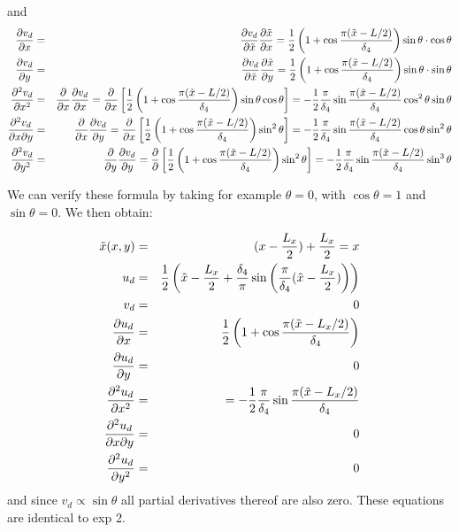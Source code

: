 and
\begin{eqnarray}
\frac{\partial v_d}{\partial x} 
&=& \frac{\partial v_d}{\partial \tilde{x}}  \frac{\partial \tilde{x}}{\partial x} 
= \frac12 \left(1+\cos\frac{ \pi ( \tilde{x}-L/2)}{\delta_4} \right) \sin\theta \cdot \cos\theta
\nonumber\\ 
\frac{\partial v_d}{\partial y} 
&=& \frac{\partial v_d}{\partial \tilde{x}}  \frac{\partial \tilde{x}}{\partial y} 
= \frac12 \left(1+\cos\frac{ \pi ( \tilde{x}-L/2)}{\delta_4} \right) \sin\theta \cdot \sin \theta
\nonumber\\
\frac{\partial^2 v_d}{\partial x^2}          
&=& \frac{\partial }{\partial x} \frac{\partial v_d}{\partial x}   
= \frac{\partial }{\partial x} \left[  \frac12 \left(1+\cos\frac{ \pi ( \tilde{x}-L/2)}{\delta_4} \right) \sin\theta \cos\theta     \right]  
= -  \frac12 \frac{\pi}{\delta_4}    \sin\frac{ \pi ( \tilde{x}-L/2)}{\delta_4}   \cos^2\theta \sin\theta
\nonumber \\
\frac{\partial^2 v_d}{\partial x \partial y} 
&=& \frac{\partial }{\partial x} \frac{\partial v_d}{\partial y}   
= \frac{\partial }{\partial x} \left[ \frac12 \left(1+\cos\frac{ \pi ( \tilde{x}-L/2)}{\delta_4} \right) \sin^2\theta    \right] 
= -\frac12 \frac{\pi}{\delta_4}   \sin\frac{ \pi ( \tilde{x}-L/2)}{\delta_4}  \cos\theta  \sin^2\theta  
\nonumber\\
\frac{\partial^2 v_d}{\partial y^2}          
&=& \frac{\partial }{\partial y} \frac{\partial v_d}{\partial y}   
= \frac{\partial }{\partial } \left[ \frac12 \left(1+\cos\frac{ \pi ( \tilde{x}-L/2)}{\delta_4} \right) \sin^2\theta      \right] 
= - \frac12 \frac{\pi}{\delta_4}  \sin\frac{ \pi ( \tilde{x}-L/2)}{\delta_4} \sin^3\theta \nonumber
\end{eqnarray}

We can verify these formula by taking for example $\theta=0$, with $\cos \theta=1$ and $\sin\theta=0$. We then obtain:

\begin{eqnarray}
\tilde{x}(x,y) &=& (x-\frac{L_x}{2}) +  \frac{L_x}{2} =x \nonumber\\
u_d &=&  \frac12 \left(\tilde{x}-\frac{L_x}{2} +\frac{\delta_4}{\pi} \sin\left(\frac{\pi}{\delta_4}(\tilde{x}-\frac{L_x}{2}) \right) \right) \nonumber\\
v_d &=&  0 
\nonumber\\
\frac{\partial u_d}{\partial x} &=& \frac12 \left(1+\cos\frac{ \pi ( \tilde{x}-L_x/2)}{\delta_4} \right) \nonumber\\
\frac{\partial u_d}{\partial y} &=& 0 \nonumber\\
\frac{\partial^2 u_d}{\partial x^2} &=& = - \frac12 \frac{\pi}{\delta_4}   \sin\frac{ \pi ( \tilde{x}-L_x/2)}{\delta_4}   \nonumber\\
\frac{\partial^2 u_d}{\partial x \partial y} &=& 0 \nonumber\\
\frac{\partial^2 u_d}{\partial y^2}   &=& 0 \nonumber
\end{eqnarray}
and since $v_d\propto \sin \theta $ all partial derivatives thereof are also zero.
These equations are identical to exp 2.


